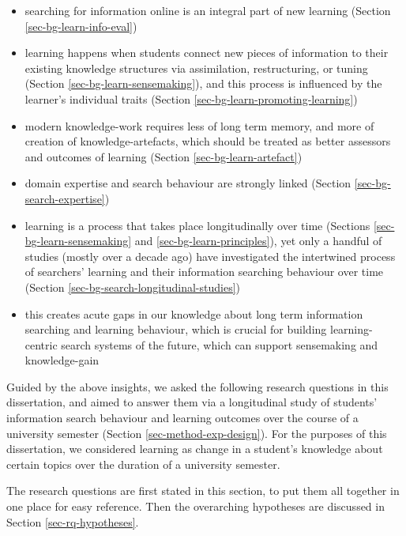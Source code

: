 \documentclass[letterpaper, nobind]{templates/ociamthesis}
\providecommand{\tightlist}{%
  \setlength{\itemsep}{0pt}\setlength{\parskip}{0pt}}
\begin{document}
\begin{itemize}
\tightlist
\item
  searching for information online is an integral part of new learning (Section \ref{sec-bg-learn-info-eval})
\item
  learning happens when students connect new pieces of information to their existing knowledge structures via assimilation, restructuring, or tuning (Section \ref{sec-bg-learn-sensemaking}), and this process is influenced by the learner's individual traits (Section \ref{sec-bg-learn-promoting-learning})
\item
  modern knowledge-work requires less of long term memory, and more of creation of knowledge-artefacts, which should be treated as better assessors and outcomes of learning (Section \ref{sec-bg-learn-artefact})
\item
  domain expertise and search behaviour are strongly linked (Section \ref{sec-bg-search-expertise})
\item
  learning is a process that takes place longitudinally over time (Sections \ref{sec-bg-learn-sensemaking} and \ref{sec-bg-learn-principles}), yet only a handful of studies (mostly over a decade ago) have investigated the intertwined process of searchers' learning and their information searching behaviour over time (Section \ref{sec-bg-search-longitudinal-studies})
\item
  this creates acute gaps in our knowledge about long term information searching and learning behaviour, which is crucial for building learning-centric search systems of the future, which can support sensemaking and knowledge-gain
\end{itemize}

Guided by the above insights, we asked the following research questions in this dissertation, and aimed to answer them via a longitudinal study of students' information search behaviour and learning outcomes over the course of a university semester (Section \ref{sec-method-exp-design}). For the purposes of this
dissertation, we considered learning as change in a student's knowledge
about certain topics over the duration of a university semester.

The research questions are first stated in this section, to put them all
together in one place for easy reference. Then the overarching
hypotheses are discussed in Section \ref{sec-rq-hypotheses}.
\end{document}
